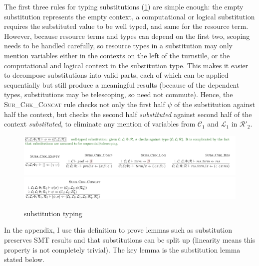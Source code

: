 The first three rules for typing substitutions (\cref{fig:soundness-sub}) are
simple enough: the empty substitution represents the empty context, a
computational or logical substitution requires the substituted value to be well
typed, and same for the resource term. However, because resource terms and
types can depend on the first two, scoping needs to be handled carefully,
so resource types in a substitution may only mention variables
either in the contexts on the left of the turnstile, or the computational
and logical context in the substitution type. This makes it easier to decompose
substitutions into valid parts, each of which can be applied sequentially but
still produce a meaningful results (because of the dependent types,
substitutions may be telescoping, so need not commute). Hence, the
\textsc{Sub\_Chk\_Concat} rule checks not only the first half $\psi$ of the
substitution against half the context, but checks the second half
\emph{substituted} against second half of the context \emph{substituted}, to
eliminate any mention of variables from $\mathcal{C}_1$ and $\mathcal{L}_1$ in
$\mathcal{R}'_2$.

\begin{figure}[tp]
    \includegraphics{figures/kernel-soundness-sub-1}
    \includegraphics{figures/kernel-soundness-sub-2}
    \caption{ substitution typing}\label{fig:soundness-sub}
\end{figure}

In the appendix, I use this definition to prove lemmas such as substitution
preserves SMT results and that substitutions can be split up (linearity means
this property is not completely trivial). The key lemma is the substitution
lemma stated below.

